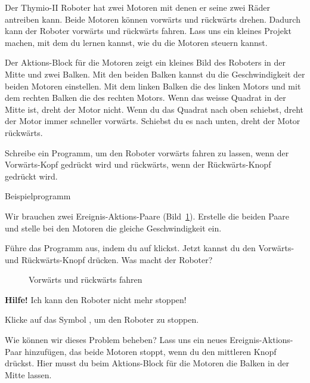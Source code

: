\label{c.moving}


Der Thymio-II Roboter hat zwei Motoren mit denen er seine zwei Räder antreiben
kann. Beide Motoren können vorwärts und rückwärts drehen. Dadurch kann der
Roboter vorwärts und rückwärts fahren. Lass uns ein kleines Projekt machen, mit
dem du lernen kannst, wie du die Motoren steuern kannst.

Der Aktions-Block für die Motoren  zeigt ein kleines Bild
des Roboters in der Mitte und zwei Balken. Mit den beiden Balken kannst du die
Geschwindigkeit der beiden Motoren einstellen. Mit dem linken Balken die des
linken Motors und mit dem rechten Balken die des rechten Motors. Wenn das
weisse Quadrat in der Mitte ist, dreht der Motor nicht. Wenn du das Quadrat
nach oben schiebst, dreht der Motor immer schneller vorwärts. Schiebst du es
nach unten, dreht der Motor rückwärts.

Schreibe ein Programm, um den Roboter vorwärts fahren zu lassen, wenn der
Vorwärts-Kopf gedrückt wird und rückwärts, wenn der Rückwärts-Knopf gedrückt
wird.

{\raggedleft \hfill Beispielprogramm }

Wir brauchen zwei Ereignis-Aktions-Paare (Bild~\ref{fig.nostop}). Erstelle die
beiden Paare und stelle bei den Motoren die gleiche Geschwindigkeit ein.

Führe das Programm aus, indem du auf  klickst. Jetzt kannst du den
Vorwärts- und Rückwärts-Knopf drücken. Was macht der Roboter?

\begin{figure}
\begin{center}
\caption{Vorwärts und rückwärts fahren}\label{fig.nostop}
\end{center}
\end{figure}


\textbf{Hilfe!} Ich kann den Roboter nicht mehr stoppen!

Klicke auf das Symbol , um den Roboter zu stoppen.

Wie können wir dieses Problem beheben? Lass uns ein neues Ereignis-Aktions-Paar
hinzufügen, das beide Motoren stoppt, wenn du den mittleren Knopf drückst.
Hier musst du beim Aktions-Block für die Motoren die Balken in der Mitte
lassen.


